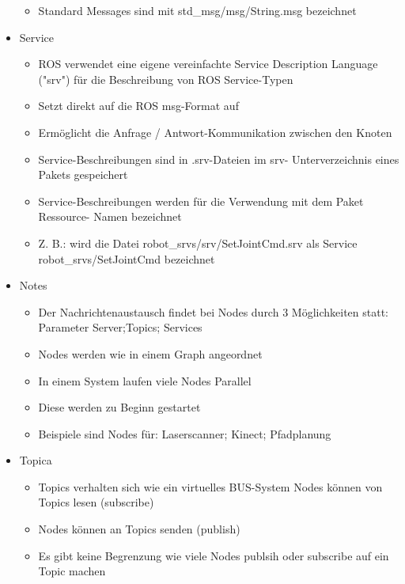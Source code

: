 \begin{itemize}
\begin{itemize}
\item Standard Messages sind mit std\_msg/msg/String.msg bezeichnet
\end{itemize}
\item Service
\begin{itemize}
 \item ROS verwendet eine eigene vereinfachte Service Description Language ("srv") für die
Beschreibung von ROS Service-Typen
\item Setzt direkt auf die ROS msg-Format auf
\item Ermöglicht die Anfrage / Antwort-Kommunikation zwischen den Knoten
\item Service-Beschreibungen sind in .srv-Dateien im srv- Unterverzeichnis eines Pakets
gespeichert
\item Service-Beschreibungen werden für die Verwendung mit dem Paket Ressource-
Namen bezeichnet
\item Z. B.: wird die Datei robot\_srvs/srv/SetJointCmd.srv als Service
robot\_srvs/SetJointCmd bezeichnet
\end{itemize}
\item Notes
\begin{itemize}
 \item Der Nachrichtenaustausch findet bei Nodes durch 3 Möglichkeiten statt: Parameter
Server;Topics; Services
\item Nodes werden wie in einem Graph angeordnet
\item In einem System laufen viele Nodes Parallel
\item Diese werden zu Beginn gestartet
\item Beispiele sind Nodes für: Laserscanner; Kinect; Pfadplanung
\end{itemize}
\item Topica
\begin{itemize}
 \item Topics verhalten sich wie ein virtuelles BUS-System Nodes können von Topics lesen
(subscribe)
\item Nodes können an Topics senden (publish)
\item Es gibt keine Begrenzung wie viele Nodes publsih oder subscribe auf ein Topic
machen
\end{itemize}
\end{itemize}
